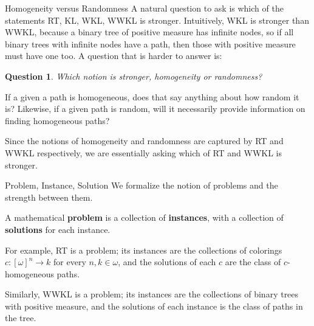 \begin{frame}{Homogeneity versus Randomness}
  A natural question to ask is which of the statements RT, KL, WKL, WWKL is
  stronger. Intuitively, WKL is stronger than WWKL, because a binary tree
  of positive measure has infinite nodes, so if all binary trees with
  infinite nodes have a path, then those with positive measure must
  have one too. A question that is harder to answer is:
  \newtheorem*{question*}{Question}
  \begin{question*}
    Which notion is stronger, homogeneity or randomness?
  \end{question*}
  If a given a path is homogeneous, does that say anything about how random
  it is? Likewise, if a given path is random, will it necessarily provide
  information on finding homogeneous paths?

  \vspace{0.5em}
  Since the notions of homogeneity and randomness are captured by RT and
  WWKL respectively, we are essentially asking which of RT and WWKL is
  stronger.
\end{frame}

\begin{frame}{Problem, Instance, Solution}
  We formalize the notion of problems and the strength between them.

  \vspace{1em}
  \begin{define*}
    A mathematical \textbf{problem} is a collection of \textbf{instances},
    with a collection of \textbf{solutions} for each instance.
  \end{define*}

  \vspace{1em}
  For example, RT is a problem; its instances are the collections of
  colorings $c:[\omega]^n\rightarrow k$ for every $n,k\in\omega$, and the
  solutions of each $c$ are the class of $c$-homogeneous paths.

  \vspace{1em}
  Similarly, WWKL is a problem; its instances are the collections of binary
  trees with positive measure, and the solutions of each instance is the
  class of paths in the tree.
\end{frame}

